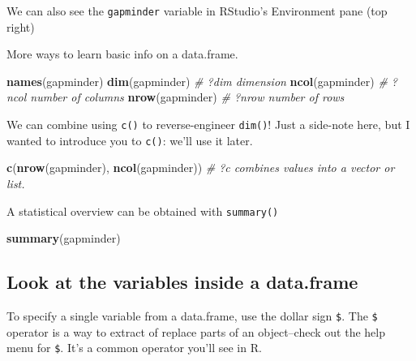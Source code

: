 \documentclass[]{book}
\newenvironment{Shaded}{\begin{snugshade}}{\end{snugshade}}
\newcommand{\KeywordTok}[1]{\textcolor[rgb]{0.13,0.29,0.53}{\textbf{{#1}}}}
\newcommand{\CommentTok}[1]{\textcolor[rgb]{0.56,0.35,0.01}{\textit{{#1}}}}
\newcommand{\NormalTok}[1]{{#1}}
\theoremstyle{definition}
\theoremstyle{definition}
\theoremstyle{definition}
\theoremstyle{remark}
\begin{document}
We can also see the \texttt{gapminder} variable in RStudio's Environment
pane (top right)

More ways to learn basic info on a data.frame.

\begin{Shaded}
\begin{Highlighting}[]
\KeywordTok{names}\NormalTok{(gapminder)}
\KeywordTok{dim}\NormalTok{(gapminder)    }\CommentTok{# ?dim dimension}
\KeywordTok{ncol}\NormalTok{(gapminder)   }\CommentTok{# ?ncol number of columns}
\KeywordTok{nrow}\NormalTok{(gapminder)   }\CommentTok{# ?nrow number of rows}
\end{Highlighting}
\end{Shaded}

We can combine using \texttt{c()} to reverse-engineer \texttt{dim()}!
Just a side-note here, but I wanted to introduce you to \texttt{c()}:
we'll use it later.

\begin{Shaded}
\begin{Highlighting}[]
\KeywordTok{c}\NormalTok{(}\KeywordTok{nrow}\NormalTok{(gapminder), }\KeywordTok{ncol}\NormalTok{(gapminder)) }\CommentTok{# ?c combines values into a vector or list. }
\end{Highlighting}
\end{Shaded}

A statistical overview can be obtained with \texttt{summary()}

\begin{Shaded}
\begin{Highlighting}[]
\KeywordTok{summary}\NormalTok{(gapminder)}
\end{Highlighting}
\end{Shaded}

\subsection{Look at the variables inside a
data.frame}\label{look-at-the-variables-inside-a-data.frame}

To specify a single variable from a data.frame, use the dollar sign
\texttt{\$}. The \texttt{\$} operator is a way to extract of replace
parts of an object--check out the help menu for \texttt{\$}. It's a
common operator you'll see in R.

\begin{Shaded}
\end{Shaded}
\end{document}

